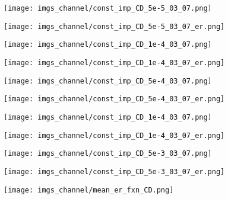 \documentclass[12pt,a4paper]{article}
\begin{document}
\begin{figure}[h!]
\centering
\texttt{[image: imgs\_channel/const\_imp\_CD\_5e-5\_03\_07.png]}
\end{figure}

\begin{figure}[h!]
\centering
\texttt{[image: imgs\_channel/const\_imp\_CD\_5e-5\_03\_07\_er.png]}
\end{figure}

\begin{figure}[h!]
\centering
\texttt{[image: imgs\_channel/const\_imp\_CD\_1e-4\_03\_07.png]}
\end{figure}

\begin{figure}[h!]
\centering
\texttt{[image: imgs\_channel/const\_imp\_CD\_1e-4\_03\_07\_er.png]}
\end{figure}


\begin{figure}[h!]
\centering
\texttt{[image: imgs\_channel/const\_imp\_CD\_5e-4\_03\_07.png]}
\end{figure}

\begin{figure}[h!]
\centering
\texttt{[image: imgs\_channel/const\_imp\_CD\_5e-4\_03\_07\_er.png]}
\end{figure}

\begin{figure}[h!]
\centering
\texttt{[image: imgs\_channel/const\_imp\_CD\_1e-4\_03\_07.png]}
\end{figure}

\begin{figure}[h!]
\centering
\texttt{[image: imgs\_channel/const\_imp\_CD\_1e-4\_03\_07\_er.png]}
\end{figure}


\begin{figure}[h!]
\centering
\texttt{[image: imgs\_channel/const\_imp\_CD\_5e-3\_03\_07.png]}
\end{figure}

\begin{figure}[h!]
\centering
\texttt{[image: imgs\_channel/const\_imp\_CD\_5e-3\_03\_07\_er.png]}
\end{figure}

\begin{figure}[h!]
\centering
\texttt{[image: imgs\_channel/mean\_er\_fxn\_CD.png]}
\end{figure}
\end{document}
